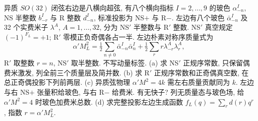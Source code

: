 \begin{exercise}
异质 $SO(32)$ 闭弦右边是八横向超弦, 有八个横向指标 $I=2,\ldots,9$ 的玻色 $\alpha_{-n}^I$, NS 半整数 $b_{-r}^I$ 与 R 整数 $d_{-n}^I$, 标准投影为 NS$+$ 与 R$-$. 左边有八个玻色 $\bar\alpha_{-n}^I$ 及 32 个实费米子 $\lambda^A$, $A=1,\ldots,32$, 分为 NS$'$ 半整数与 R$'$ 整数. NS$'$ 真空规定 $( -1)^{F_L}=+1$; R$'$ 零模正负奇偶各占一半. 左边朴素对称序质量式为
\[
 \alpha'M_L^2=\tfrac12\sum_{n\ne0}\bar\alpha_{-n}^I\bar\alpha_n^I
 +\tfrac12\sum_r r\lambda_{-r}^A\lambda_r^A,
\]
R$'$ 取整数 $r=n$, NS$'$ 取半整数. 不写动量标签.
(a) 求 NS$'$ 正规序常数, 只保留偶费米激发, 列全前三个质量层及简并数.
(b) 求 R$'$ 正规序常数和正奇偶真空数, 在总正奇偶投影下列前两层.
(c) 异质弦物理 $\alpha'M^2=4k$ 需左右质量贡献同为 $k$. 左边与右 NS$+$ 张量积给玻色, 与右 R$-$ 给费米. 有无快子? 列无质量态与玻色场, 给 $\alpha'M^2=4$ 时玻色加费米总数.
(d) 求完整投影左边生成函数 $f_L(q)=\sum_r d(r)q^r$, 指数 $r=\alpha'M_L^2$.
\end{exercise}
